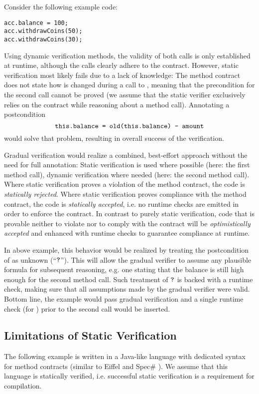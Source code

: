 Consider the following example code:
\begin{lstlisting}
acc.balance = 100;
acc.withdrawCoins(50);
acc.withdrawCoins(30);
\end{lstlisting}

Using dynamic verification methods, the validity of both calls is only established at runtime, although the calls clearly adhere to the contract.
However, static verification most likely fails due to a lack of knowledge:
The method contract does not state how  is changed during a call to , meaning that the precondition for the second call cannot be proved (we assume that the static verifier exclusively relies on the contract while reasoning about a method call).
Annotating a postcondition $$\textup{\texttt{this.balance = old(this.balance) - amount}}$$ would solve that problem, resulting in overall success of the verification.

Gradual verification would realize a combined, best-effort approach without the need for full annotation:
Static verification is used where possible (here: the first method call), dynamic verification where needed (here: the second method call).
Where static verification proves a violation of the method contract, the code is \emph{statically rejected}.
Where static verification proves compliance with the method contract, the code is \emph{statically accepted}, i.e. no runtime checks are emitted in order to enforce the contract.
In contrast to purely static verification, code that is provable neither to violate nor to comply with the contract will be \emph{optimistically accepted} and enhanced with runtime checks to guarantee compliance at runtime.

In above example, this behavior would be realized by treating the postcondition of  as unknown (“$\textup{\texttt{?}}$”).
This will allow the gradual verifier to assume any plausible formula for subsequent reasoning, e.g. one stating that the balance is still high enough for the second method call.
Such treatment of $\textup{\texttt{?}}$ is backed with a runtime check, making sure that all assumptions made by the gradual verifier were valid.
Bottom line, the example would pass gradual verification and a single runtime check (for ) prior to the second call would be inserted.

\subsection{Limitations of Static Verification}
\label{ssec:limitations-of-static}
The following example is written in a Java-like language with dedicated syntax for method contracts (similar to Eiffel \cite{meyer1988eiffel} and Spec\# \cite{the-spec-programming-system-an-overview}).
We assume that this language is statically verified, i.e. successful static verification is a requirement for compilation.

